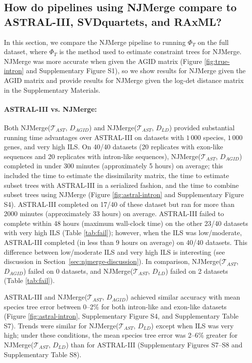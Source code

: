\subsection{How do pipelines using NJMerge compare to ASTRAL-III, SVDquartets, and RAxML?}
In this section, we compare the NJMerge pipeline to running $\Phi_T$ on the full dataset, where $\Phi_T$ is the method used to estimate constraint trees for NJMerge.
NJMerge was more accurate when given the AGID matrix (Figure \ref{fig:true-intron} and Supplementary Figure S1), so we show results for NJMerge given the AGID  matrix and provide results for NJMerge given the log-det distance matrix in the Supplementary Materials.

\paragraph{ASTRAL-III vs. NJMerge:}
Both NJMerge($\mathcal{T}_{AST}$, $D_{AGID}$) and NJMerge($\mathcal{T}_{AST}$, $D_{LD}$) provided substantial running time advantages over ASTRAL-III on datasets with $1\,000$ species, $1\,000$ genes, and very high ILS.
On 40/40 datasets (20 replicates with exon-like sequences and 20 replicates with intron-like sequences), NJMerge($\mathcal{T}_{AST}$, $D_{AGID}$) completed in under 300 minutes (approximately 5 hours) on average; this included the time to estimate the dissimilarity matrix, the time to estimate subset trees with ASTRAL-III in a serialized fashion, and the time to combine subset trees using NJMerge (Figure \ref{fig:astral-intron} and Supplementary Figure S4).
ASTRAL-III completed on 17/40 of these dataset but ran for more than 2000 minutes (approximately 33 hours) on average.
ASTRAL-III failed to complete within 48 hours (maximum wall-clock time) on the other 23/40 datasets with very high ILS (Table \ref{tab:fail}); however, when the ILS was low/moderate, ASTRAL-III completed (in less than 9 hours on average) on 40/40 datasets.
This difference between low/moderate ILS and very high ILS is interesting (see discussion in Section~\ref{sec:njmerge-discussion}).
In comparison, NJMerge($\mathcal{T}_{AST}$, $D_{AGID}$) failed on 0 datasets, and NJMerge($\mathcal{T}_{AST}$, $D_{LD}$) failed on 2 datasets (Table \ref{tab:fail}).

ASTRAL-III and NJMerge($\mathcal{T}_{AST}$, $D_{AGID}$) achieved similar accuracy with mean species tree error between 0--2\% for both intron-like and exon-like datasets (Figure \ref{fig:astral-intron}, Supplementary Figure S4, and Supplementary Table S7).
Trends were similar for NJMerge($\mathcal{T}_{AST}$, $D_{LD}$) except when ILS was very high; under these conditions, the mean species tree error was 2--6\% greater for NJMerge($\mathcal{T}_{AST}$, $D_{LD}$)  than for ASTRAL-III (Supplementary Figures S7--S8 and Supplementary Table S8).

